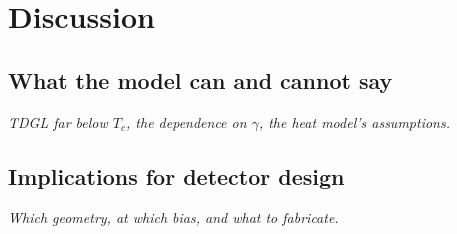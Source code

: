 \chapter{Discussion}
\label{chapter:discussion}

\section{What the model can and cannot say}
\label{sec:di-validity}
\emph{TDGL far below $T_c$, the dependence on $\gamma$, the heat model's assumptions.}

\section{Implications for detector design}
\label{sec:di-design}
\emph{Which geometry, at which bias, and what to fabricate.}
